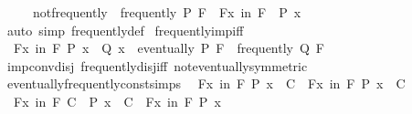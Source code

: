 \begin{isabellebody}
\ \ \ \ \ not{\isacharunderscore}{\kern0pt}frequently{\isacharcolon}{\kern0pt}\ {\isachardoublequoteopen}{\isasymnot}\ frequently\ P\ F\ {\isasymlongleftrightarrow}\ {\isacharparenleft}{\kern0pt}{\isasymforall}\isactrlsub Fx\ in\ F{\isachardot}{\kern0pt}\ {\isasymnot}\ P\ x{\isacharparenright}{\kern0pt}{\isachardoublequoteclose}\isanewline
%
\isadelimproof
\ \ %
\endisadelimproof
%
\isatagproof
{}\isamarkupfalse%
\ {\isacharparenleft}{\kern0pt}auto\ simp{\isacharcolon}{\kern0pt}\ frequently{\isacharunderscore}{\kern0pt}def{\isacharparenright}{\kern0pt}%
\endisatagproof
{\isafoldproof}%
%
\isadelimproof
\isanewline
%
\endisadelimproof
\isanewline
{}\isamarkupfalse%
\ frequently{\isacharunderscore}{\kern0pt}imp{\isacharunderscore}{\kern0pt}iff{\isacharcolon}{\kern0pt}\isanewline
\ \ {\isachardoublequoteopen}{\isacharparenleft}{\kern0pt}{\isasymexists}\isactrlsub Fx\ in\ F{\isachardot}{\kern0pt}\ P\ x\ {\isasymlongrightarrow}\ Q\ x{\isacharparenright}{\kern0pt}\ {\isasymlongleftrightarrow}\ {\isacharparenleft}{\kern0pt}eventually\ P\ F\ {\isasymlongrightarrow}\ frequently\ Q\ F{\isacharparenright}{\kern0pt}{\isachardoublequoteclose}\isanewline
%
\isadelimproof
\ \ %
\endisadelimproof
%
\isatagproof
{}\isamarkupfalse%
\ imp{\isacharunderscore}{\kern0pt}conv{\isacharunderscore}{\kern0pt}disj\ frequently{\isacharunderscore}{\kern0pt}disj{\isacharunderscore}{\kern0pt}iff\ not{\isacharunderscore}{\kern0pt}eventually{\isacharbrackleft}{\kern0pt}symmetric{\isacharbrackright}{\kern0pt}\ \isacommand{{\isachardot}{\kern0pt}{\isachardot}{\kern0pt}}\isamarkupfalse%
%
\endisatagproof
{\isafoldproof}%
%
\isadelimproof
\isanewline
%
\endisadelimproof
\isanewline
{}\isamarkupfalse%
\ eventually{\isacharunderscore}{\kern0pt}frequently{\isacharunderscore}{\kern0pt}const{\isacharunderscore}{\kern0pt}simps{\isacharcolon}{\kern0pt}\isanewline
\ \ {\isachardoublequoteopen}{\isacharparenleft}{\kern0pt}{\isasymexists}\isactrlsub Fx\ in\ F{\isachardot}{\kern0pt}\ P\ x\ {\isasymand}\ C{\isacharparenright}{\kern0pt}\ {\isasymlongleftrightarrow}\ {\isacharparenleft}{\kern0pt}{\isasymexists}\isactrlsub Fx\ in\ F{\isachardot}{\kern0pt}\ P\ x{\isacharparenright}{\kern0pt}\ {\isasymand}\ C{\isachardoublequoteclose}\isanewline
\ \ {\isachardoublequoteopen}{\isacharparenleft}{\kern0pt}{\isasymexists}\isactrlsub Fx\ in\ F{\isachardot}{\kern0pt}\ C\ {\isasymand}\ P\ x{\isacharparenright}{\kern0pt}\ {\isasymlongleftrightarrow}\ C\ {\isasymand}\ {\isacharparenleft}{\kern0pt}{\isasymexists}\isactrlsub Fx\ in\ F{\isachardot}{\kern0pt}\ P\ x{\isacharparenright}{\kern0pt}{\isachardoublequoteclose}\isanewline

\end{isabellebody}
